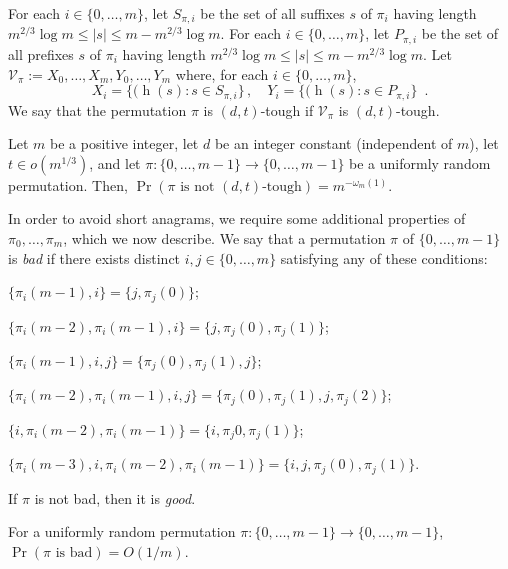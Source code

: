 \documentclass[kpfonts]{patmorin}
\DeclareMathOperator{\hist}{h}
\begin{document}
For each $i\in\{0,\ldots,m\}$, let $S_{\pi,i}$ be the set of all suffixes $s$ of $\pi_i$ having length $m^{2/3}\log m \le |s|\le m-m^{2/3}\log m$.  For each $i\in\{0,\ldots,m\}$, let $P_{\pi,i}$ be the set of all prefixes $s$ of $\pi_i$ having length $m^{2/3}\log m \le |s|\le m-m^{2/3}\log m$.
Let $\mathcal{V}_{\pi}:=X_0,\ldots,X_m,Y_0,\ldots,Y_m$ where, for each $i\in\{0,\ldots,m\}$,
\[
    X_i=\{(\hist(s) : s\in S_{\pi,i}\}\,, \quad
    Y_i=\{(\hist(s) : s\in P_{\pi,i}\} \enspace .
\]
We say that the permutation $\pi$ is $(d,t)$-tough if $\mathcal{V}_{\pi}$ is $(d,t)$-tough.

\begin{lem}\label{tough_permutations}
    Let $m$ be a positive integer, let $d$ be an integer constant (independent of $m$), let $t\in o(m^{1/3})$,  and let $\pi:\{0,\ldots,m-1\}\to\{0,\ldots,m-1\}$ be a uniformly random permutation.  Then, $\Pr\left(\mbox{$\pi$ is not $(d,t)$-tough}\right)=m^{-\omega_m(1)}$.
\end{lem}

In order to avoid short anagrams, we require some additional properties of $\pi_0,\ldots,\pi_m$, which we now describe.  We say that a permutation $\pi$ of $\{0,\ldots,m-1\}$ is \emph{bad} if there exists distinct $i,j\in\{0,\ldots,m\}$ satisfying any of these conditions:
\begin{compactenum}[(C1)]
    \item $\{\pi_i(m-1),i\}=\{j,\pi_j(0)\}$;\label{two_two}\label{first}
    \item $\{\pi_i(m-2),\pi_i(m-1),i\} = \{j,\pi_j(0),\pi_j(1)\}$;\label{three_three}

    \item $\{\pi_i(m-1),i,j\}=\{\pi_j(0),\pi_j(1),j\}$;\label{two_three}
    \item $\{\pi_i(m-2),\pi_i(m-1),i,j\}=\{\pi_j(0),\pi_j(1),j,\pi_j(2)\}$;\label{three_four}

    \item $\{i,\pi_i(m-2),\pi_i(m-1)\}=\{i,\pi_j{0},\pi_j(1)\}$;
    \item $\{\pi_i(m-3),i,\pi_i(m-2),\pi_i(m-1)\}=\{i,j,\pi_j(0),\pi_j(1)\}$.\label{last}
\end{compactenum}
If $\pi$ is not bad, then it is \emph{good}.

\begin{lem}\label{bad_permutations}
    For a uniformly random permutation $\pi:\{0,\ldots,m-1\}\to\{0,\ldots,m-1\}$, $\Pr(\mbox{$\pi$ is bad}) = O(1/m)$.
\end{lem}
\end{document}
